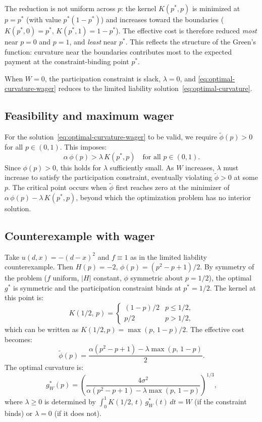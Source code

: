\documentclass[11pt]{article}
\begin{document}
The reduction is not uniform across $p$: the kernel $K(p^*,p)$ is minimized at $p = p^*$ (with value $p^*(1-p^*)$) and increases toward the boundaries ($K(p^*,0) = p^*$, $K(p^*,1) = 1-p^*$). The effective cost is therefore reduced \emph{most} near $p = 0$ and $p = 1$, and \emph{least} near $p^*$. This reflects the structure of the Green's function: curvature near the boundaries contributes most to the expected payment at the constraint-binding point $p^*$.

When $W = 0$, the participation constraint is slack, $\lambda = 0$, and \eqref{eq:optimal-curvature-wager} reduces to the limited liability solution~\eqref{eq:optimal-curvature}.

\subsection{Feasibility and maximum wager}

For the solution~\eqref{eq:optimal-curvature-wager} to be valid, we require $\tilde{\phi}(p) > 0$ for all $p \in (0,1)$. This imposes:
\[
\alpha\,\phi(p) > \lambda\,K(p^*,p) \quad \text{for all } p \in (0,1).
\]
Since $\phi(p) > 0$, this holds for $\lambda$ sufficiently small. As $W$ increases, $\lambda$ must increase to satisfy the participation constraint, eventually violating $\tilde{\phi} > 0$ at some $p$. The critical point occurs when $\tilde{\phi}$ first reaches zero at the minimizer of $\alpha\,\phi(p) - \lambda\,K(p^*,p)$, beyond which the optimization problem has no interior solution.

\subsection{Counterexample with wager}

Take $u(d,x) = -(d-x)^2$ and $f \equiv 1$ as in the limited liability counterexample. Then $H(p) = -2$, $\phi(p) = (p^2 - p + 1)/2$. By symmetry of the problem ($f$ uniform, $|H|$ constant, $\phi$ symmetric about $p = 1/2$), the optimal $g^*$ is symmetric and the participation constraint binds at $p^* = 1/2$. The kernel at this point is:
\[
K(1/2,\,p) = \begin{cases} (1-p)/2 & p \leq 1/2, \\ p/2 & p > 1/2, \end{cases}
\]
which can be written as $K(1/2,p) = \max(p,\,1-p)/2$. The effective cost becomes:
\[
\tilde{\phi}(p) = \frac{\alpha(p^2 - p + 1) - \lambda\max(p,\,1-p)}{2}.
\]
The optimal curvature is:
\begin{equation}\label{eq:wager-counterexample}
g^*_W(p) = \left(\frac{4\sigma^2}{\alpha(p^2 - p + 1) - \lambda\max(p,\,1-p)}\right)^{1/3},
\end{equation}
where $\lambda \geq 0$ is determined by $\int_0^1 K(1/2,\,t)\,g^*_W(t)\,dt = W$ (if the constraint binds) or $\lambda = 0$ (if it does not).
\end{document}
